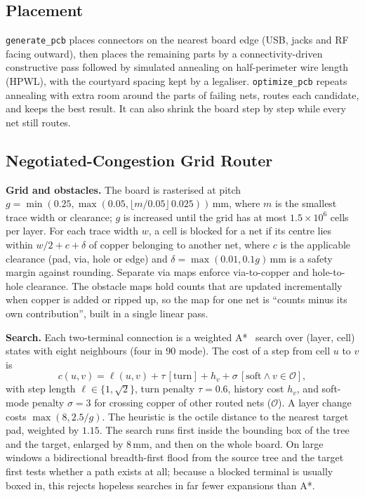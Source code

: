 \documentclass[journal]{IEEEtran}
\newcommand{\tool}[1]{\texttt{\small #1}}
\begin{document}
\subsection{Placement}
\texttt{generate\_pcb} places connectors on the nearest board edge (USB, jacks and RF facing outward), then places the remaining parts by a connectivity-driven constructive pass followed by simulated annealing on half-perimeter wire length (HPWL), with the courtyard spacing kept by a legaliser. \tool{optimize\_pcb} repeats annealing with extra room around the parts of failing nets, routes each candidate, and keeps the best result. It can also shrink the board step by step while every net still routes.

\subsection{Negotiated-Congestion Grid Router}
\label{sec:router}

\textbf{Grid and obstacles.} The board is rasterised at pitch $g=\min(0.25, \max(0.05, \lfloor m/0.05\rfloor\,0.025))$\,mm, where $m$ is the smallest trace width or clearance; $g$ is increased until the grid has at most $1.5\times10^6$ cells per layer. For each trace width $w$, a cell is blocked for a net if its centre lies within $w/2 + c + \delta$ of copper belonging to another net, where $c$ is the applicable clearance (pad, via, hole or edge) and $\delta=\max(0.01, 0.1g)$\,mm is a safety margin against rounding. Separate via maps enforce via-to-copper and hole-to-hole clearance. The obstacle maps hold counts that are updated incrementally when copper is added or ripped up, so the map for one net is ``counts minus its own contribution'', built in a single linear pass.

\textbf{Search.} Each two-terminal connection is a weighted A*~\cite{hart1968} search over (layer, cell) states with eight neighbours (four in 90\textdegree{} mode). The cost of a step from cell $u$ to $v$ is
\begin{equation}
c(u,v) = \ell(u,v) + \tau\,[\text{turn}] + h_v + \sigma\,[\text{soft}\wedge v\in\mathcal{O}] ,
\end{equation}
with step length $\ell\in\{1,\sqrt2\}$, turn penalty $\tau=0.6$, history cost $h_v$, and soft-mode penalty $\sigma=3$ for crossing copper of other routed nets ($\mathcal{O}$). A layer change costs $\max(8, 2.5/g)$. The heuristic is the octile distance to the nearest target pad, weighted by $1.15$. The search runs first inside the bounding box of the tree and the target, enlarged by 8\,mm, and then on the whole board. On large windows a bidirectional breadth-first flood from the source tree and the target first tests whether a path exists at all; because a blocked terminal is usually boxed in, this rejects hopeless searches in far fewer expansions than A*.
\end{document}

